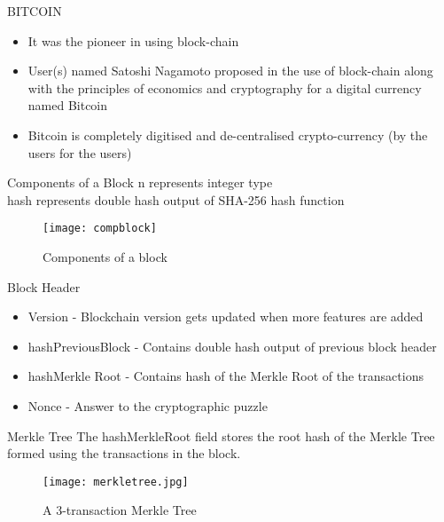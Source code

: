 \documentclass{beamer}
\begin{document}
\begin{frame}{BITCOIN}
\begin{itemize}
    \item It was the pioneer in using block-chain 
    \item User(s) named Satoshi Nagamoto proposed in \cite{nakamoto2008bitcoin} the use of block-chain along with the principles of economics and cryptography for a digital currency named Bitcoin 
    \item Bitcoin is completely digitised and de-centralised crypto-currency (by the users for the users)
\end{itemize}
    
\end{frame}


\begin{frame}{Components of a Block}
n represents integer type \\
hash represents double hash output of SHA-256 hash function
\begin{figure}[H]\centering 
\texttt{[image: compblock]}
\caption{Components of a block}
\end{figure}
    
\end{frame}
\begin{frame}{Block Header}
\begin{itemize}
    \item Version - Blockchain version gets updated when more features are added
    \item hashPreviousBlock - Contains double hash output of previous block header
    \item hashMerkle Root - Contains hash of the Merkle Root of the transactions
    \item Nonce - Answer to the cryptographic puzzle
\end{itemize}

 
\end{frame}
\begin{frame}{Merkle Tree}
The hashMerkleRoot field stores the root hash of the Merkle Tree formed using the transactions in the block.
\begin{figure}[H]\centering 
\texttt{[image: merkletree.jpg]}
\caption{A 3-transaction Merkle Tree}
\end{figure}
\end{frame}
\end{document}
